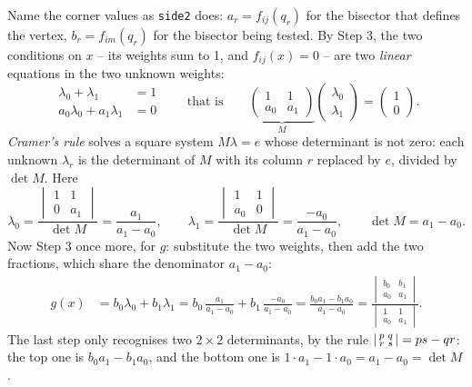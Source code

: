 \documentclass[11pt,a4paper]{article}
\newcommand{\code}[1]{\texttt{#1}}
\theoremstyle{remark}
\begin{document}
Name the corner values as \code{side2} does: $a_r = f_{ij}(q_r)$ for the bisector that defines
the vertex, $b_r = f_{im}(q_r)$ for the bisector being tested. By Step 3, the two conditions on
$x$ -- its weights sum to 1, and $f_{ij}(x) = 0$ -- are two \emph{linear} equations in the two
unknown weights:
\[
  \begin{aligned}
    \lambda_0 + \lambda_1 &= 1\\
    a_0\lambda_0 + a_1\lambda_1 &= 0
  \end{aligned}
  \qquad\text{that is}\qquad
  \underbrace{\begin{pmatrix} 1 & 1\\ a_0 & a_1 \end{pmatrix}}_{M}
  \begin{pmatrix} \lambda_0\\ \lambda_1 \end{pmatrix}
  = \begin{pmatrix} 1\\ 0 \end{pmatrix}.
\]
\emph{Cramer's rule} solves a square system $M\lambda = e$ whose determinant is not zero: each
unknown $\lambda_r$ is the determinant of $M$ with its column $r$ replaced by $e$, divided by
$\det M$. Here
\[
  \lambda_0 = \frac{\begin{vmatrix} 1 & 1\\ 0 & a_1 \end{vmatrix}}{\det M}
            = \frac{a_1}{a_1 - a_0},
  \qquad
  \lambda_1 = \frac{\begin{vmatrix} 1 & 1\\ a_0 & 0 \end{vmatrix}}{\det M}
            = \frac{-a_0}{a_1 - a_0},
  \qquad
  \det M = a_1 - a_0 .
\]
Now Step 3 once more, for $g$: substitute the two weights, then add the two fractions, which
share the denominator $a_1 - a_0$:
\begin{align*}
  g(x) &= b_0\lambda_0 + b_1\lambda_1
        = b_0\,\frac{a_1}{a_1 - a_0} + b_1\,\frac{-a_0}{a_1 - a_0}
        = \frac{b_0 a_1 - b_1 a_0}{a_1 - a_0}
        = \frac{\begin{vmatrix} b_0 & b_1\\ a_0 & a_1 \end{vmatrix}}
               {\begin{vmatrix} 1 & 1\\ a_0 & a_1 \end{vmatrix}} .
\end{align*}
The last step only recognises two $2\times2$ determinants, by the rule
$\begin{vsmallmatrix} p & q\\ r & s \end{vsmallmatrix} = ps - qr$: the top one is
$b_0a_1 - b_1a_0$, and the bottom one is $1\cdot a_1 - 1\cdot a_0 = a_1 - a_0 = \det M$.
\end{document}
